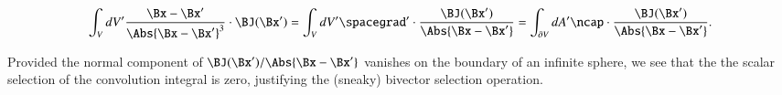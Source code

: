 \begin{dmath}\label{eqn:biotSavartGreens:100}
 \int_V dV' \frac{\Bx - \Bx'}{ \Abs{\Bx - \Bx'}^3 } \cdot \BJ(\Bx')
=  \int_V dV' \spacegrad' \cdot \frac{\BJ(\Bx')}{ \Abs{\Bx - \Bx'} }
=  \int_{\partial V} dA' \ncap \cdot \frac{\BJ(\Bx')}{ \Abs{\Bx - \Bx'} }.
\end{dmath}

Provided the normal component of \( \BJ(\Bx')/\Abs{\Bx - \Bx'} \) vanishes on the boundary of an infinite sphere, we see that the
the scalar selection of the convolution integral is zero, justifying the (sneaky) bivector selection operation.

